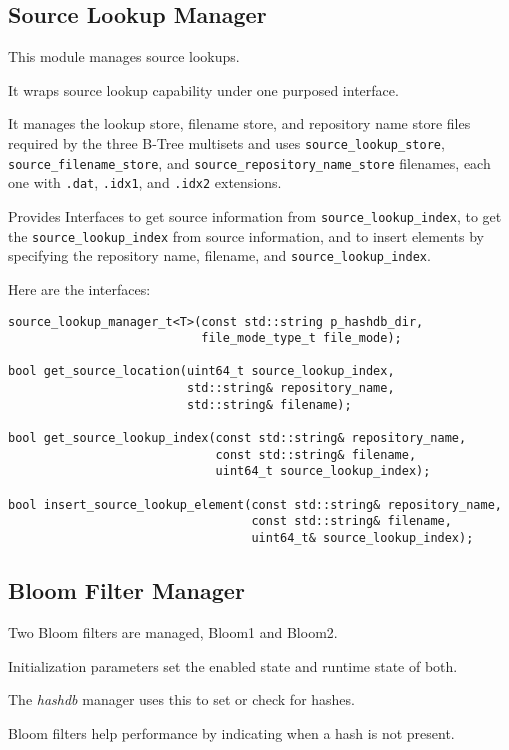\documentclass[12pt,twoside]{article}
\newcommand{\hdb}{\emph{hashdb}\xspace}
\begin{document}
\subsection{Source Lookup Manager}
This module manages source lookups.
\begin{compactitem}
\item It wraps source lookup capability under one purposed interface.
\item It manages the lookup store, filename store,
and repository name store files required by the three B-Tree multisets
and uses
\texttt{source\_lookup\_store},
\texttt{source\_filename\_store}, and
\texttt{source\_repository\_name\_store}
filenames, each one with
\texttt{.dat}, \texttt{.idx1}, and \texttt{.idx2} extensions.
\item Provides Interfaces to get source information
from \texttt{source\_lookup\_index},
to get the \texttt{source\_lookup\_index} from source information,
and to insert elements by specifying the repository name, filename,
and \texttt{source\_lookup\_index}.
\end{compactitem}

Here are the interfaces:

\begin{small}
\begin{verbatim}
source_lookup_manager_t<T>(const std::string p_hashdb_dir,
                           file_mode_type_t file_mode);

bool get_source_location(uint64_t source_lookup_index,
                         std::string& repository_name,
                         std::string& filename);

bool get_source_lookup_index(const std::string& repository_name,
                             const std::string& filename,
                             uint64_t source_lookup_index);

bool insert_source_lookup_element(const std::string& repository_name,
                                  const std::string& filename,
                                  uint64_t& source_lookup_index);
\end{verbatim}
\end{small}

\subsection{Bloom Filter Manager}
\begin{compactitem}
\item Two Bloom filters are managed, Bloom1 and Bloom2.
\item Initialization parameters set the enabled state and runtime state of both.
\item The \hdb manager uses this to set or check for hashes.
\item Bloom filters help performance by indicating when a hash is not present.
\end{compactitem}
\end{document}
